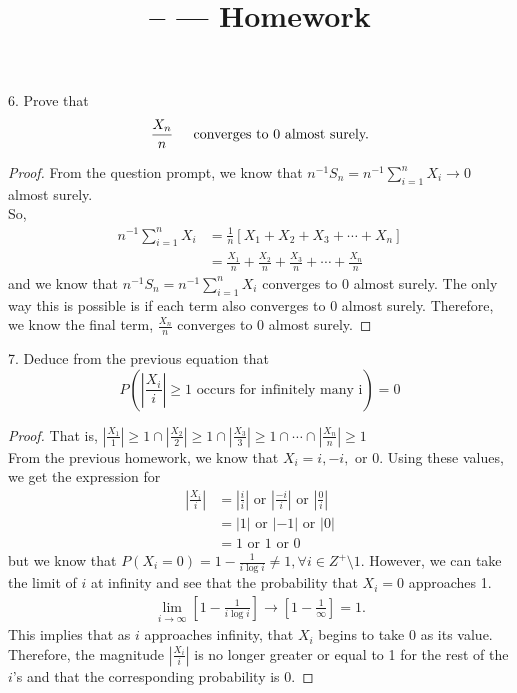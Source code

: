 \documentclass[11pt]{article}
\title{\CRS -- \Session --- Homework \Homework} %
\author{\Name}
\date{}
\begin{document}
\maketitle

6. Prove that 
\begin{equation}
	\frac{X_n}{n} \hspace{0.2in}\text{converges to 0 almost surely.}
\end{equation}
\begin{proof}
From the question prompt, we know that $n^{-1}S_n = n^{-1}\sum_{i=1}^{n} X_i \to 0$ almost surely. \\
So, 
\begin{align*}
	n^{-1}\sum_{i=1}^{n} X_i &= \frac{1}{n}\left[ X_1 + X_2 + X_3 + \cdots + X_n \right] \\
	&= \frac{X_1}{n} + \frac{X_2}{n} + \frac{X_3}{n} + \cdots + \frac{X_n}{n}
\end{align*}
and we know that $n^{-1}S_n = n^{-1}\sum_{i=1}^{n} X_i$ converges to 0 almost surely. The only way this is possible is if each term also converges to 0 almost surely.
Therefore, we know the final term, $\frac{X_n}{n}$ converges to 0 almost surely.
\end{proof}
7. Deduce from the previous equation that
\begin{equation}
	P \left( \left| \frac{X_i}{i} \right| \ge 1 \text{ occurs for infinitely many i} \right) = 0
\end{equation}
\begin{proof}
	That is, $\left| \frac{X_1}{1} \right| \ge 1 \cap \left| \frac{X_2}{2} \right| \ge 1 \cap \left| \frac{X_3}{3} \right| \ge 1 \cap \cdots \cap \left| \frac{X_n}{n} \right| \ge 1$ \\
	From the previous homework, we know that $X_i = i, -i, \text{ or } 0.$ Using these values, we get the expression for
	\begin{align*}
		\left| \frac{X_i}{i} \right| &= \left| \frac{i}{i} \right| \text{ or } \left| \frac{-i}{i} \right| \text{ or } \left| \frac{0}{i} \right| \\
		&= \left| 1 \right| \text{ or } \left| -1 \right| \text{ or } \left| 0 \right| \\
		&= 1 \text{ or } 1 \text{ or } 0
	\end{align*}
	but we know that $P\left(X_i = 0 \right) = 1 - \frac{1}{i\log i} \neq 1, \forall i \in Z^{+} \setminus 1$. However, we can take the limit of $i$ at infinity and see that the probability that $X_i = 0$ approaches 1. 
	\begin{align*}
		\lim_{i \to \infty} \left[ 1 - \frac{1}{i \log i}\right] \to \left[ 1 - \frac{1}{\infty}\right] = 1.
	\end{align*}
	This implies that as $i$ approaches infinity, that $X_i$ begins to take 0 as its value. Therefore, the magnitude $\left| \frac{X_i}{i} \right|$ is no longer greater or equal to 1 for the rest of the $i$'s and that the corresponding probability is 0.
\end{proof}
\end{document}
